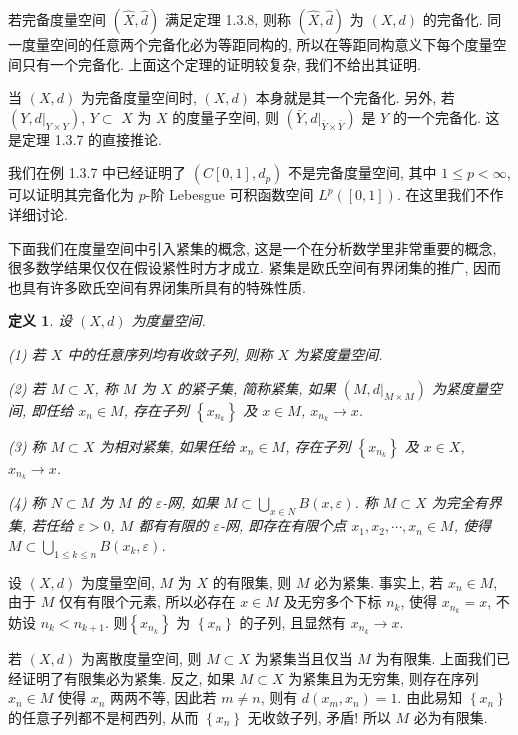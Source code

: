 \documentclass[openany]{ctexbook}
\theoremstyle{kaiti}
\newtheorem{definition}{定义}[section]
\theoremstyle{normal}
\begin{document}
若完备度量空间 $(\hat{X}, \hat{d})$ 满足定理 1.3.8, 则称 $(\hat{X}, \hat{d})$ 为 $(X, d)$ 的完备化. 同一度量空间的任意两个完备化必为等距同构的, 所以在等距同构意义下每个度量空间只有一个完备化. 上面这个定理的证明较复杂, 我们不给出其证明.

当 $(X, d)$ 为完备度量空间时, $(X, d)$ 本身就是其一个完备化. 另外, 若 $(Y,d|_{Y \times Y})$, $Y \subset$ $X$ 为 $X$ 的度量子空间, 则 $(\bar{Y},d|_{\bar{Y} \times \bar{Y}})$ 是 $Y$ 的一个完备化. 这是定理 1.3.7 的直接推论.

我们在例 1.3.7 中已经证明了 $(C[0,1], d_{p})$ 不是完备度量空间, 其中 $1\leqslant p<\infty$, 可以证明其完备化为 $p$-阶 Lebesgue 可积函数空间 $L^p([0,1])$. 在这里我们不作详细讨论.

下面我们在度量空间中引入紧集的概念, 这是一个在分析数学里非常重要的概念, 很多数学结果仅仅在假设紧性时方才成立. 紧集是欧氏空间有界闭集的推广, 因而也具有许多欧氏空间有界闭集所具有的特殊性质.

\begin{definition}
设 $(X, d)$ 为度量空间.

(1) 若 $X$ 中的任意序列均有收敛子列, 则称 $X$ 为紧度量空间.

(2) 若 $M \subset X$, 称 $M$ 为 $X$ 的紧子集, 简称紧集, 如果 $\left(M,\left.d\right|_{M \times M}\right)$ 为紧度量空间, 即任给 $x_n \in M$, 存在子列 $\left\{x_{n_{k}}\right\}$ 及 $x \in M$, $x_{n_{k}} \rightarrow x$.

(3) 称 $M \subset X$ 为相对紧集, 如果任给 $x_n \in M$, 存在子列 $\left\{x_{n_{k}}\right\}$ 及 $x \in X$, $x_{n_{k}} \rightarrow x$.

(4) 称 $N \subset M$ 为 $M$ 的 $\varepsilon$-网, 如果 $M \subset \bigcup_{x \in N} B(x, \varepsilon)$. 称 $M \subset X$ 为完全有界集, 若任给 $\varepsilon>0$, $M$ 都有有限的 $\varepsilon$-网, 即存在有限个点 $x_1, x_2, \cdots, x_n \in M$, 使得 $M \subset \bigcup_{1 \leqslant k \leqslant n} B\left(x_{k}, \varepsilon\right)$. 
\end{definition}

设 $(X, d)$ 为度量空间, $M$ 为 $X$ 的有限集, 则 $M$ 必为紧集. 事实上, 若 $x_n \in M$, 由于 $M$ 仅有有限个元素, 所以必存在 $x \in M$ 及无穷多个下标 $n_{k}$, 使得 $x_{n_{k}}=x$, 不妨设 $n_{k}<n_{k+1}$. 则$\left\{x_{n_{k}}\right\}$ 为 $\left\{x_n\right\}$ 的子列, 且显然有 $x_{n_{k}} \rightarrow x$.

若 $(X, d)$ 为离散度量空间, 则 $M \subset X$ 为紧集当且仅当 $M$ 为有限集. 上面我们已经证明了有限集必为紧集. 反之, 如果 $M \subset X$ 为紧集且为无穷集, 则存在序列 $x_n \in M$ 使得 $x_n$ 两两不等, 因此若 $m \neq n$, 则有 $d\left(x_m, x_n\right)=1$. 由此易知 $\left\{x_n\right\}$ 的任意子列都不是柯西列, 从而 $\left\{x_n\right\}$ 无收敛子列, 矛盾! 所以 $M$ 必为有限集.
\end{document}
